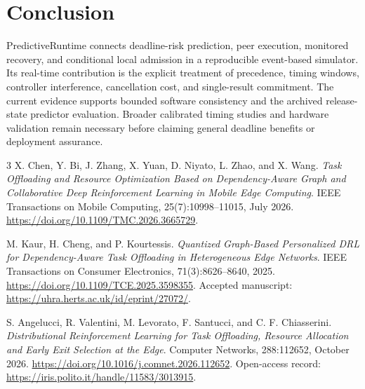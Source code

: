 \documentclass[11pt,a4paper]{article}
\begin{document}
\section{Conclusion}
PredictiveRuntime connects deadline-risk prediction, peer execution, monitored
recovery, and conditional local admission in a reproducible event-based simulator.
Its real-time contribution is the explicit treatment of precedence, timing windows,
controller interference, cancellation cost, and single-result commitment.
The current evidence supports bounded software consistency and the archived
release-state predictor evaluation. Broader calibrated timing studies and hardware
validation remain necessary before claiming general deadline benefits or deployment
assurance.

\begin{thebibliography}{3}
X. Chen, Y. Bi, J. Zhang, X. Yuan, D. Niyato, L. Zhao, and X. Wang.
\emph{Task Offloading and Resource Optimization Based on Dependency-Aware
Graph and Collaborative Deep Reinforcement Learning in Mobile Edge Computing}.
IEEE Transactions on Mobile Computing, 25(7):10998--11015, July 2026.
\url{https://doi.org/10.1109/TMC.2026.3665729}.

M. Kaur, H. Cheng, and P. Kourtessis.
\emph{Quantized Graph-Based Personalized DRL for Dependency-Aware Task
Offloading in Heterogeneous Edge Networks}.
IEEE Transactions on Consumer Electronics, 71(3):8626--8640, 2025.
\url{https://doi.org/10.1109/TCE.2025.3598355}.
Accepted manuscript: \url{https://uhra.herts.ac.uk/id/eprint/27072/}.

S. Angelucci, R. Valentini, M. Levorato, F. Santucci, and C. F. Chiasserini.
\emph{Distributional Reinforcement Learning for Task Offloading, Resource
Allocation and Early Exit Selection at the Edge}.
Computer Networks, 288:112652, October 2026.
\url{https://doi.org/10.1016/j.comnet.2026.112652}.
Open-access record: \url{https://iris.polito.it/handle/11583/3013915}.
\end{thebibliography}
\end{document}
